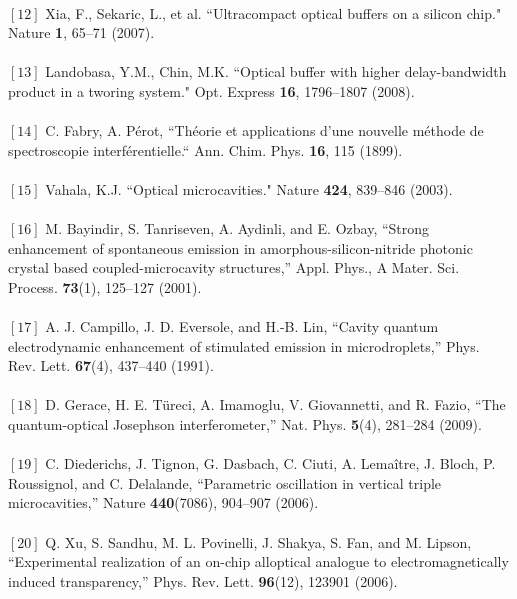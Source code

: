 {\\$[12]$ Xia, F., Sekaric, L., et al. “Ultracompact optical buffers on a silicon chip." Nature \textbf{1}, 65–71
(2007).\\
\\$[13]$ Landobasa, Y.M., Chin, M.K. “Optical buffer with higher delay-bandwidth product in a tworing system." Opt. Express \textbf{16}, 1796–1807 (2008).\\
\\$[14]$ C. Fabry, A. Pérot, “Théorie et applications d’une nouvelle méthode de spectroscopie interférentielle.“ Ann. Chim. Phys. \textbf{16}, 115 (1899).\\
\\$[15]$ Vahala, K.J. “Optical microcavities." Nature \textbf{424}, 839–846 (2003).\\
\\$[16]$ M. Bayindir, S. Tanriseven, A. Aydinli, and E. Ozbay, “Strong enhancement of spontaneous emission in
amorphous-silicon-nitride photonic crystal based coupled-microcavity structures,” Appl. Phys., A Mater. Sci.
Process. \textbf{73}(1), 125–127 (2001).\\
\\$[17]$ A. J. Campillo, J. D. Eversole, and H.-B. Lin, “Cavity quantum electrodynamic enhancement of stimulated
emission in microdroplets,” Phys. Rev. Lett. \textbf{67}(4), 437–440 (1991).\\
\\$[18]$ D. Gerace, H. E. Türeci, A. Imamoglu, V. Giovannetti, and R. Fazio, “The quantum-optical Josephson
interferometer,” Nat. Phys. \textbf{5}(4), 281–284 (2009).\\
\\$[19]$  C. Diederichs, J. Tignon, G. Dasbach, C. Ciuti, A. Lemaître, J. Bloch, P. Roussignol, and C. Delalande,
“Parametric oscillation in vertical triple microcavities,” Nature \textbf{440}(7086), 904–907 (2006).\\
\\$[20]$ Q. Xu, S. Sandhu, M. L. Povinelli, J. Shakya, S. Fan, and M. Lipson, “Experimental realization of an on-chip alloptical analogue to electromagnetically induced transparency,” Phys. Rev. Lett. \textbf{96}(12), 123901 (2006).}